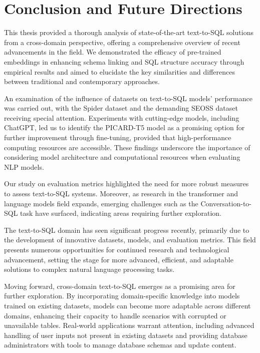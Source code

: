 \section{Conclusion and Future Directions}

This thesis provided a thorough analysis of state-of-the-art text-to-SQL solutions from a cross-domain perspective, offering a comprehensive overview of recent advancements in the field. We demonstrated the efficacy of pre-trained embeddings in enhancing schema linking and SQL structure accuracy through empirical results and aimed to elucidate the key similarities and differences between traditional and contemporary approaches.

An examination of the influence of datasets on text-to-SQL models' performance was carried out, with the Spider dataset and the demanding SEOSS dataset receiving special attention. Experiments with cutting-edge models, including ChatGPT, led us to identify the PICARD-T5 model as a promising option for further improvement through fine-tuning, provided that high-performance computing resources are accessible. These findings underscore the importance of considering model architecture and computational resources when evaluating NLP models.

Our study on evaluation metrics highlighted the need for more robust measures to assess text-to-SQL systems. Moreover, as research in the transformer and language models field expands, emerging challenges such as the Conversation-to-SQL task have surfaced, indicating areas requiring further exploration.

The text-to-SQL domain has seen significant progress recently, primarily due to the development of innovative datasets, models, and evaluation metrics. This field presents numerous opportunities for continued research and technological advancement, setting the stage for more advanced, efficient, and adaptable solutions to complex natural language processing tasks.

Moving forward, cross-domain text-to-SQL emerges as a promising area for further exploration. By incorporating domain-specific knowledge into models trained on existing datasets, models can become more adaptable across different domains, enhancing their capacity to handle scenarios with corrupted or unavailable tables. Real-world applications warrant attention, including advanced handling of user inputs not present in existing datasets and providing database administrators with tools to manage database schemas and update content.

